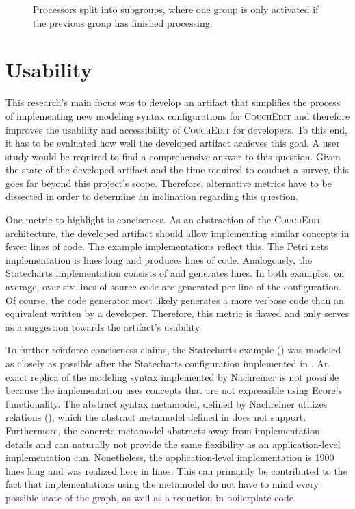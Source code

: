 \begin{figure}
  \centering
  
  \caption{Processors split into subgroups, where one group is only activated if the previous group has finished processing.}
  \label{fig:sub-groups}
\end{figure}

\section{Usability}
This research's main focus was to develop an artifact that simplifies the process of implementing new modeling syntax configurations for \textsc{CouchEdit} and therefore improves the usability and accessibility of \textsc{CouchEdit} for developers. To this end, it has to be evaluated how well the developed artifact achieves this goal. A user study would be required to find a comprehensive answer to this question. Given the state of the developed artifact and the time required to conduct a survey, this goes far beyond this project's scope. Therefore, alternative metrics have to be dissected in order to determine an inclination regarding this question.

One metric to highlight is conciseness. As an abstraction of the \textsc{CouchEdit} architecture, the developed artifact should allow implementing similar concepts in fewer lines of code. The example implementations reflect this. The Petri nets implementation is \petriConfigLoC lines long and produces \petriGeneratedLoC lines of code. Analogously, the Statecharts implementation consists of \stateConfigLoC and generates \stateGeneratedLoC lines. In both examples, on average, over six lines of source code are generated per line of the configuration. Of course, the code generator most likely generates a more verbose code than an equivalent written by a developer. Therefore, this metric is flawed and only serves as a suggestion towards the artifact's usability.

To further reinforce conciseness claims, the Statecharts example () was modeled as closely as possible after the Statecharts configuration implemented in \cite{nachreiner_couchedit_2020}. An exact replica of the modeling syntax implemented by Nachreiner is not possible because the implementation uses concepts that are not expressible using Ecore's functionality. The abstract syntax metamodel, defined by Nachreiner utilizes relations (), which the abstract metamodel defined in  does not support. Furthermore, the concrete metamodel abstracts away from implementation details and can naturally not provide the same flexibility as an application-level implementation can.  Nonetheless, the application-level implementation is 1900 lines long \cite{nachreiner_couchedit_2020} and was realized here in \stateConfigLoC lines. This can primarily be contributed to the fact that implementations using the metamodel do not have to mind every possible state of the graph, as well as a reduction in boilerplate code.

